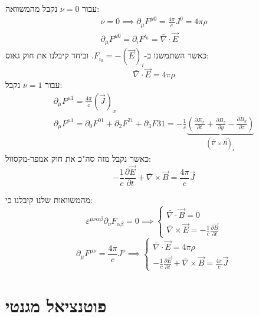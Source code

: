 \documentclass{tstextbook}
\begin{document}
עבור \(\nu=0\) נקבל מהמשוואה:
\begin{gather*}\nu=0\implies \partial_{\mu} F^{\mu 0}= \frac{4\pi}{c}J^0=4\pi \rho  \\\partial_{\mu}F^{\mu 0}=\partial_{i} F^{i_{0}}= \bar{\nabla} \cdot \vec{E}
\end{gather*}
כאשר השתמשנו ב-\(F_{i_{0}}=-\left( \vec{E} \right)_{i}\). וביחד קיבלנו את חוק גאוס:
$$\bar{\nabla} \cdot \vec{E}=4\pi \rho$$
עבור \(\nu=1\) נקבל:
\begin{gather*}\partial_{\mu}F^{\mu 1}=\frac{4\pi}{c}\left( \vec{J} \right)_{x}  \\\partial_{\mu} F^{\mu 1} = \partial_{0} F^{01}+\partial_{2} F^{21}+\partial_{3}F{31}=-\frac{1}{c}\underbrace{ \left( \frac{\partial E_{x}}{\partial t} +\frac{\partial B_{z}}{\partial y} -\frac{\partial B_{y}}{\partial z}  \right) }_{ \left( \bar{\nabla} \times \vec{B} \right)_{x} }
\end{gather*}
כאשר נקבל מזה סה"כ את חוק אמפר-מקסוול:
$$-\frac{1}{c}\frac{\partial \vec{E}}{\partial t} + \bar{\nabla} \times \vec{B} = \frac{4\pi}{c}\vec{J}$$

\begin{corollary}
מהמשוואות שלנו קיבלנו כי:
$$\varepsilon^{\mu \nu \alpha \beta}\partial_{\nu}F_{\alpha \beta}=0\implies \begin{cases}\bar{\nabla} \cdot \vec{B} = 0 \\\bar{\nabla} \times \vec{E} = -\frac{1}{c} \frac{\partial \vec{B}}{\partial t} 
\end{cases}$$$$\partial_{\mu}F^{\mu \nu}=\frac{4\pi}{c}J^{\nu}\implies\begin{cases} \bar{\nabla} \cdot \vec{E}=4\pi \rho \\-\frac{1}{c}\frac{\partial \vec{E}}{\partial t} + \bar{\nabla} \times \vec{B} = \frac{4\pi}{c}\vec{J} 
\end{cases}$$

\end{corollary}

\section{פוטנציאל מגנטי}
\end{document}
